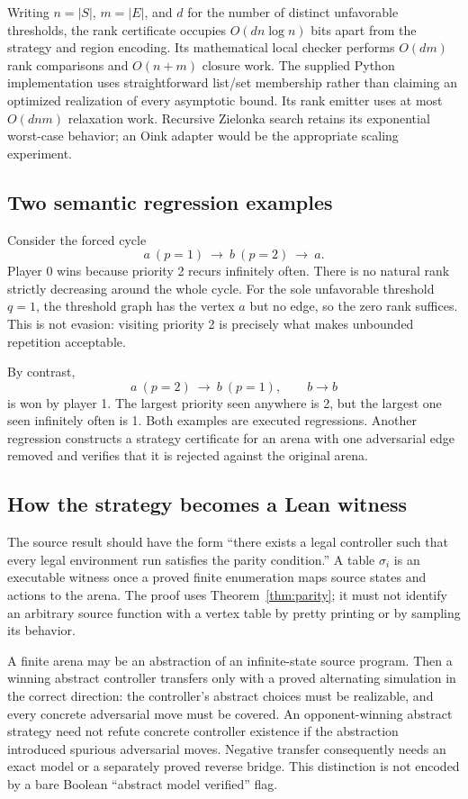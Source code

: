 Writing $n=|S|$, $m=|E|$, and $d$ for the number of distinct unfavorable
thresholds, the rank certificate occupies $O(dn\log n)$ bits apart from the
strategy and region encoding. Its mathematical local checker performs $O(dm)$
rank comparisons and $O(n+m)$ closure work. The supplied Python implementation
uses straightforward list/set membership rather than claiming an optimized
realization of every asymptotic bound. Its rank emitter uses at most $O(dnm)$
relaxation work. Recursive Zielonka search retains its exponential worst-case
behavior; an Oink adapter would be the appropriate scaling experiment.

\subsection{Two semantic regression examples}

Consider the forced cycle
\[
 a\ (p=1)\ \longrightarrow\ b\ (p=2)\ \longrightarrow\ a.
\]
Player 0 wins because priority 2 recurs infinitely often. There is no natural
rank strictly decreasing around the whole cycle. For the sole unfavorable
threshold $q=1$, the threshold graph has the vertex $a$ but no edge, so the
zero rank suffices. This is not evasion: visiting priority 2 is precisely what
makes unbounded repetition acceptable.

By contrast,
\[
 a\ (p=2)\ \longrightarrow\ b\ (p=1),\qquad b\longrightarrow b
\]
is won by player 1. The largest priority seen anywhere is 2, but the largest
one seen infinitely often is 1. Both examples are executed regressions. Another
regression constructs a strategy certificate for an arena with one adversarial
edge removed and verifies that it is rejected against the original arena.

\subsection{How the strategy becomes a Lean witness}

The source result should have the form ``there exists a legal controller such
that every legal environment run satisfies the parity condition.'' A table
$\sigma_i$ is an executable witness once a proved finite enumeration maps source
states and actions to the arena. The proof uses Theorem~\ref{thm:parity}; it
must not identify an arbitrary source function with a vertex table by pretty
printing or by sampling its behavior.

A finite arena may be an abstraction of an infinite-state source program.
Then a winning abstract controller transfers only with a proved alternating
simulation in the correct direction: the controller's abstract choices must be
realizable, and every concrete adversarial move must be covered. An
opponent-winning abstract strategy need not refute concrete controller
existence if the abstraction introduced spurious adversarial moves. Negative
transfer consequently needs an exact model or a separately proved reverse
bridge. This distinction is not encoded by a bare Boolean ``abstract model
verified'' flag.


